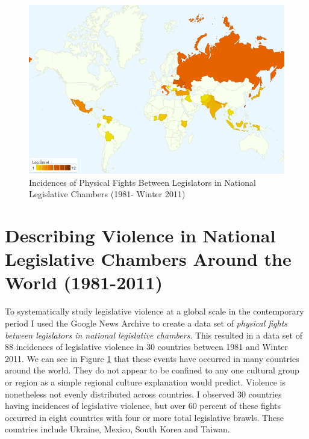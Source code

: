 \documentclass[a4paper]{article}\usepackage[]{graphicx}\usepackage[]{color}
\begin{document}
\begin{figure}[h!]
    \centering
    \caption{Incidences of Physical Fights Between Legislators in National Legislative Chambers (1981- Winter 2011)}
    \label{leg_map}
        \includegraphics[width = 13cm]{incidence_map.png}
\end{figure}

\section{Describing Violence in National Legislative Chambers Around the World (1981-2011)}

To systematically study legislative violence at a global scale in the contemporary period I used the Google News Archive to create a data set of {\emph{physical fights between legislators in national legislative chambers}}. This resulted in a data set of 88 incidences of legislative violence in 30 countries between 1981 and Winter 2011. We can see in Figure \ref{leg_map} that these events have occurred in many countries around the world. They do not appear to be confined to any one cultural group or region as a simple regional culture explanation would predict. Violence is nonetheless not evenly distributed across countries. I observed 30 countries having incidences of legislative violence, but over 60 percent of these fights occurred in eight countries with four or more total legislative brawls. These countries include Ukraine, Mexico, South Korea and Taiwan. 
\end{document}
